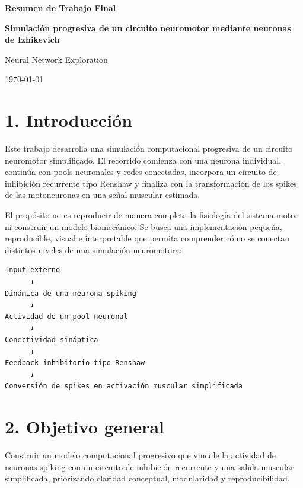 \documentclass[11pt,a4paper]{article}
\begin{document}
\begin{titlepage}
  \centering
  \vspace*{3.0cm}
  {\Huge\bfseries\color{ink} Resumen de Trabajo Final \par}
  \vspace{1.2cm}
  {\LARGE\bfseries\color{accent} Simulación progresiva de un circuito neuromotor mediante neuronas de Izhikevich \par}
  \vfill
  {\large Neural Network Exploration \par}
  \vspace{0.3cm}
  {\large \today \par}
\end{titlepage}

\tableofcontents
\newpage

\hypertarget{introducciuxf3n}{%
\section{1. Introducción}\label{introducciuxf3n}}

Este trabajo desarrolla una simulación computacional progresiva de un
circuito neuromotor simplificado. El recorrido comienza con una neurona
individual, continúa con pools neuronales y redes conectadas, incorpora
un circuito de inhibición recurrente tipo Renshaw y finaliza con la
transformación de los spikes de las motoneuronas en una señal muscular
estimada.

El propósito no es reproducir de manera completa la fisiología del
sistema motor ni construir un modelo biomecánico. Se busca una
implementación pequeña, reproducible, visual e interpretable que permita
comprender cómo se conectan distintos niveles de una simulación
neuromotora:

\begin{lstlisting}
Input externo
      ↓
Dinámica de una neurona spiking
      ↓
Actividad de un pool neuronal
      ↓
Conectividad sináptica
      ↓
Feedback inhibitorio tipo Renshaw
      ↓
Conversión de spikes en activación muscular simplificada
\end{lstlisting}

\hypertarget{objetivo-general}{%
\section{2. Objetivo general}\label{objetivo-general}}

Construir un modelo computacional progresivo que vincule la actividad de
neuronas spiking con un circuito de inhibición recurrente y una salida
muscular simplificada, priorizando claridad conceptual, modularidad y
reproducibilidad.
\end{document}
